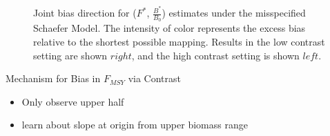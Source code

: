 \documentclass[ xcolor = pdftex, dvipsnames, table ]{beamer}
\begin{document}
\begin{frame}
\begin{figure}[h!]
\begin{minipage}[h!]{0.09\textwidth}
\end{minipage}
\caption{
Joint bias direction for ($F^*$, $\frac{B^*}{B_0}$) estimates under
the misspecified Schaefer Model. The intensity of color represents the excess
bias relative to the shortest possible mapping. Results in the low contrast setting
are shown $right$, and the high contrast setting is shown $left$.
}
\label{arrowsPT}
\end{figure}
\end{frame}

%
\begin{frame}{Mechanism for Bias in $F_{MSY}$ via Contrast}

\begin{minipage}[h!]{0.45\textwidth}
\begin{itemize}
\color{red}
\item Only observe upper half
\item learn about slope at origin from upper biomass range
\end{itemize}
\end{minipage}
\begin{minipage}[h!]{0.50\textwidth}
\end{minipage}
\end{frame}
\end{document}
